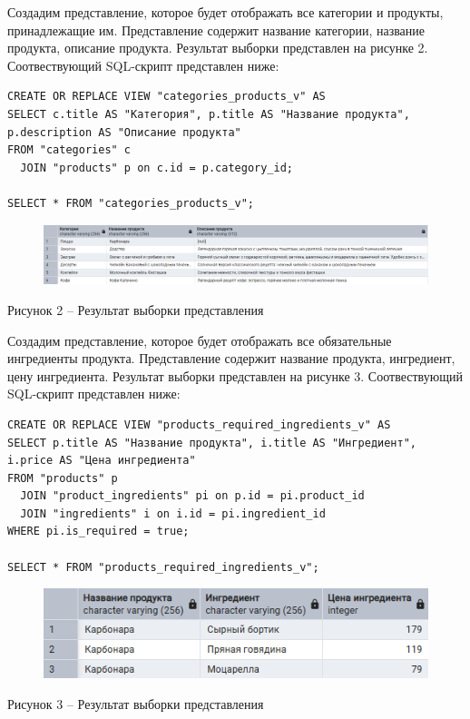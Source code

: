 \documentclass[a4paper,14pt]{extarticle}
\begin{document}
  Создадим представление, которое будет отображать все категории и продукты, принадлежащие им. Представление содержит название категории, название продукта, описание продукта. Результат выборки представлен на рисунке 2. Соотвествующий SQL-скрипт представлен ниже:

  \noindent
  \begin{Verbatim}[tabsize=4,fontsize=\small]
CREATE OR REPLACE VIEW "categories_products_v" AS
SELECT c.title AS "Категория", p.title AS "Название продукта", p.description AS "Описание продукта"
FROM "categories" c
  JOIN "products" p on c.id = p.category_id;

SELECT * FROM "categories_products_v";
  \end{Verbatim}

  \begin{figure}[h]
    \centering
    \includegraphics[width=1\linewidth]{img/view-2}
  \end{figure}
  \begin{center}
    Рисунок 2 – Результат выборки представления
  \end{center}

  Создадим представление, которое будет отображать все обязательные ингредиенты продукта. Представление содержит название продукта, ингредиент, цену ингредиента. Результат выборки представлен на рисунке 3. Соотвествующий SQL-скрипт представлен ниже:

  \noindent
  \begin{Verbatim}[tabsize=4,fontsize=\small]
CREATE OR REPLACE VIEW "products_required_ingredients_v" AS
SELECT p.title AS "Название продукта", i.title AS "Ингредиент", i.price AS "Цена ингредиента" 
FROM "products" p
  JOIN "product_ingredients" pi on p.id = pi.product_id
  JOIN "ingredients" i on i.id = pi.ingredient_id
WHERE pi.is_required = true;

SELECT * FROM "products_required_ingredients_v";
  \end{Verbatim}

  \begin{figure}[h]
    \centering
    \includegraphics[width=0.75\linewidth]{img/view-3}
  \end{figure}
  \begin{center}
    Рисунок 3 – Результат выборки представления
  \end{center}
\end{document}
